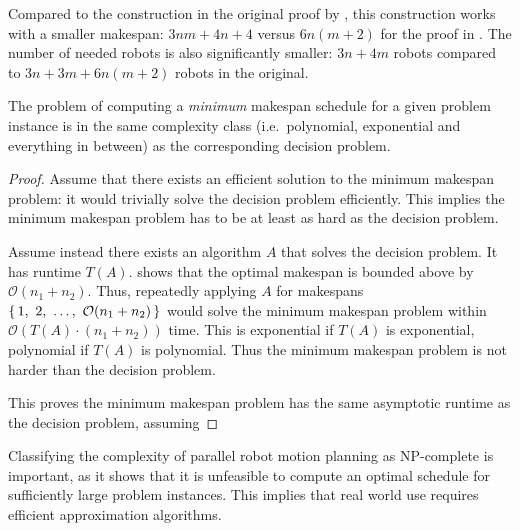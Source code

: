 Compared to the construction in the original proof by \cite{siamcomp/DemaineFKMS19}, this construction works with a smaller makespan: \(3nm + 4n + 4\) versus \(6n(m + 2)\) for the proof in \cite{siamcomp/DemaineFKMS19}. 
The number of needed robots is also significantly smaller: \(3n + 4m\) robots compared to \(3n + 3m + 6n(m + 2)\) robots in the original. 

\begin{corollary}
	The problem of computing a \emph{minimum} makespan schedule for a given problem instance is in the same complexity class (i.e.~polynomial, exponential and everything in between) as the corresponding decision problem.
\end{corollary}

\begin{proof}
	Assume that there exists an efficient solution to the minimum makespan problem: it would trivially solve the decision problem efficiently.
	This implies the minimum makespan problem has to be at least as hard as the decision problem.

	
	Assume instead there exists an algorithm \(A\) that solves the decision problem.
	It has runtime \(T(A)\).
	\cite{siamcomp/DemaineFKMS19} shows that the optimal makespan is bounded above by \(\mathcal{O}(n_1 + n_2)\).
	Thus, repeatedly applying \(A\) for makespans \(\set{1,\ 2,\ \dots,\ \mathcal{O}(n_1 + n_2)}\) would solve the minimum makespan problem within \(\mathcal{O}(T(A) \cdot (n_1 + n_2) )\) time.
	This is exponential if \(T(A)\) is exponential, polynomial if \(T(A)\) is polynomial.
	Thus the minimum makespan problem is not harder than the decision problem.

	This proves the minimum makespan problem has the same asymptotic runtime as the decision problem, assuming 
\end{proof} 

Classifying the complexity of parallel robot motion planning as NP-complete is important, as it shows that it is unfeasible to compute an optimal schedule for sufficiently large problem instances. 
This implies that real world use requires efficient approximation algorithms.


